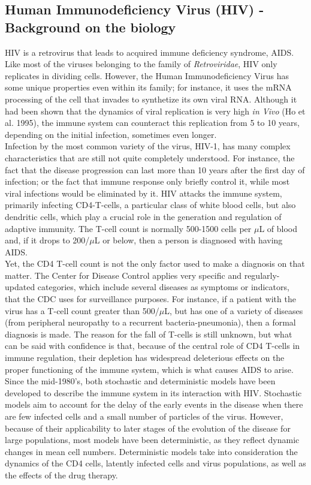 \subsection{Human Immunodeficiency Virus (HIV) - Background on the biology}
HIV is a retrovirus that leads to acquired immune deficiency syndrome, AIDS. Like most of the viruses belonging to the family of \textit{Retroviridae}, HIV only replicates in dividing cells. However, the Human Immunodeficiency Virus has some unique properties even within its family; for instance, it uses the mRNA processing of the cell that invades to synthetize its own viral RNA. Although it had been shown that the dynamics of viral replication is very high \textit{in Vivo} (Ho et al. 1995), the immune system can counteract this replication from 5 to 10 years, depending on the initial infection, sometimes even longer.\\
Infection by the most common variety of the virus, HIV-1, has many complex characteristics that are still not quite completely understood. For instance, the fact that the disease progression can last more than 10 years after the first day of infection; or the fact that immune response only briefly control it, while most viral infections would be eliminated by it. HIV attacks the immune system, primarily infecting CD4-T-cells, a particular class of white blood cells, but also dendritic cells, which play a crucial role in the generation and regulation of adaptive immunity. The T-cell count is normally 500-1500 cells per $\mu$L of blood and, if it drops to 200/$\mu$L or below, then a person is diagnosed with having AIDS. \\
Yet, the CD4 T-cell count is not the only factor used to make a diagnosis on that matter. The Center for Disease Control applies very specific and regularly-updated categories, which include several diseases as symptoms or indicators, that the CDC uses for surveillance purposes. For instance, if a patient with the virus has a T-cell count greater than 500/$\mu$L, but has one of a variety of diseases (from peripheral neuropathy to a recurrent bacteria-pneumonia), then a formal diagnosis is made. The reason for the fall of T-cells is still unknown, but what can be said with confidence is that, because of the central role of CD4 T-cells in immune regulation, their depletion has widespread deleterious effects on the proper functioning of the immune system, which is what causes AIDS to arise.\\
Since the mid-1980's, both stochastic and deterministic models have been developed to describe the immune system in its interaction with HIV. Stochastic models aim to account for the delay of the early events in the disease when there are few infected cells and a small number of particles of the virus. However, because of their applicability to later stages of the evolution of the disease for large populations, most models have been deterministic, as they reflect dynamic changes in mean cell numbers. Deterministic models take into consideration the dynamics of the CD4 cells, latently infected cells and virus populations, as well as the effects of the drug therapy.\\
